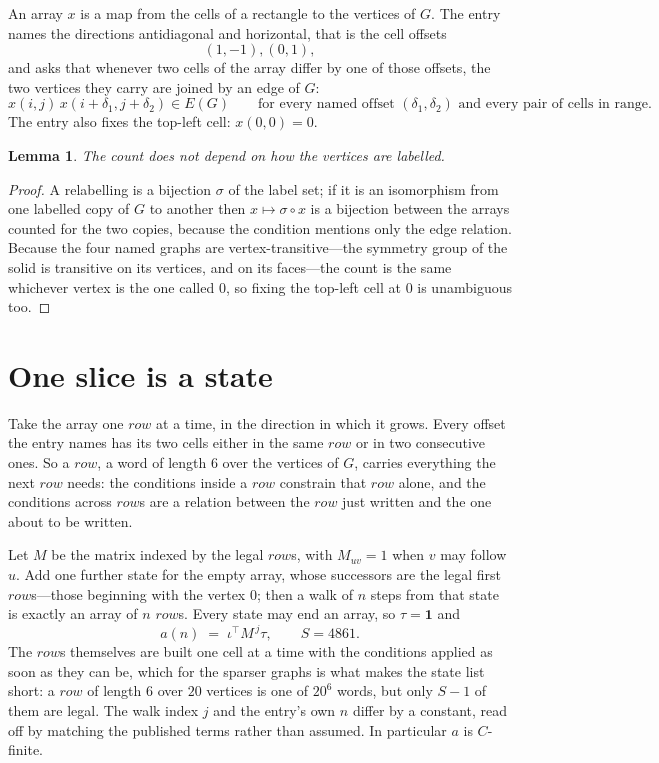 \documentclass[11pt,a4paper]{article}
\theoremstyle{plain}
\newtheorem{lemma}[theorem]{Lemma}
\theoremstyle{definition}
\begin{document}
An array $x$ is a map from the cells of a rectangle to the vertices of $G$. The entry names the
directions antidiagonal and horizontal, that is the cell offsets
\[
(1,-1), (0,1),
\]
and asks that whenever two cells of the array differ by one of those offsets, the two vertices
they carry are joined by an edge of $G$:
\[
x(i,j)\,x(i+\delta_1,j+\delta_2)\in E(G)\qquad
\text{for every named offset } (\delta_1,\delta_2)\text{ and every pair of cells in range.}
\]
The entry also fixes the top-left cell: $x(0,0)=0$.

\begin{lemma}\label{lem:label}
The count does not depend on how the vertices are labelled.
\end{lemma}

\begin{proof}
A relabelling is a bijection $\sigma$ of the label set; if it is an isomorphism from one
labelled copy of $G$ to another then $x\mapsto\sigma\circ x$ is a bijection between the arrays
counted for the two copies, because the condition mentions only the edge relation.
Because the four named graphs are vertex-transitive---the symmetry group of the solid is transitive on its vertices, and on its faces---the count is the same whichever vertex is the one called $0$, so fixing the top-left cell at $0$ is unambiguous too.
\end{proof}

\section{One slice is a state}

Take the array one $row$ at a time, in the direction in which it grows.
Every offset the entry names has its two cells either in the same $row$ or in two
consecutive ones. So a $row$, a word of length $6$ over the vertices of $G$, carries
everything the next $row$ needs: the conditions inside a $row$ constrain that
$row$ alone, and the conditions across $row$s are a relation between the
$row$ just written and the one about to be written.

Let $M$ be the matrix indexed by the legal $row$s, with $M_{uv}=1$ when $v$ may
follow $u$. Add one further state for the empty array, whose successors are the legal first
$row$s---those beginning with the vertex $0$; then a walk of
$n$ steps from that state is exactly an array of $n$ $row$s. Every state may end an
array, so $\tau=\mathbf{1}$ and
\[
a(n)\;=\;\iota^{\!\top}M^{\,j}\tau ,\qquad S=4861.
\]
The $row$s themselves are built one cell at a time with the conditions applied as soon
as they can be, which for the sparser graphs is what makes the state list short: a $row$
of length $6$ over $20$ vertices is one of $20^{6}$ words, but only $S-1$ of them are
legal. The walk index $j$ and the entry's own $n$ differ by a constant, read off by matching the
published terms rather than assumed. In particular $a$ is $C$-finite.
\end{document}
